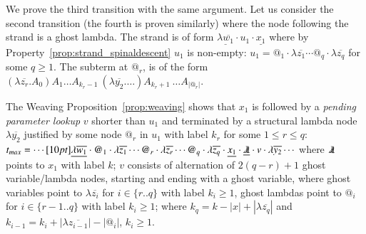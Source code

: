 \documentclass{elsarticle}
\theoremstyle{plain}
\theoremstyle{definition}
\newcommand{\ghostlmd}{{\lambda\mkern-7mu \lambda}}
\begin{document}
We prove the third transition with the same argument.
Let us consider the second transition (the fourth is proven similarly) where the node following the strand is a ghost lambda. The strand is of form $\underline{\lambda\overline{w_1}} \cdot u_1 \cdot \underline{x_1} $ where by Property~\ref{prop:strand_spinaldescent} $u_1$ is  non-empty: $u_1 =
@_1 \cdot\lambda\overline{z_1} \cdots @_q\cdot \lambda\overline{z_q}$ for some $q\geq 1$. The subterm at $@_r$, is of the form
$(\lambda\overline{z_r}. A_0) A_1 \ldots A_{k_{r}-1}\ (\lambda\overline{y_2}. \ldots)A_{k_{r}+1}\ \ldots A_{|@_r|}$.

The Weaving Proposition~\ref{prop:weaving} shows that $x_1$ is followed by a \emph{pending parameter lookup} $v$ shorter than $u_1$ and terminated by a structural lambda node $\lambda\overline{y_2}$ justified by some node $@_r$ in $u_1$ with label $k_r$ for some $1\leq r \leq q$:
$
   t_{max} = \cdots \Pstr[10pt]{
   {\underline{\lambda\overline{w_1}}}
   \cdot {@_1}
   \cdot \lambda\overline{z_1}
   \cdots %
        {@_r}
   \cdot \lambda\overline{z_r}
   \cdots {@_q}
   \cdot\lambda\overline{z_q}
   \cdot %
        {\underline{x_1}}
   \cdot %
        {\underline\ghostlmd}
   \cdot v
   \cdot %
        {\lambda\overline{y_2}}
   \cdots }
   $
where
$\ghostlmd$ points to $x_1$ with label $k$;
$v$ consists of alternation of $2(q-r) +1$ ghost variable/lambda nodes, starting and ending with a ghost variable,
where ghost variables point to $\lambda\overline{z_i}$ for
$i \in \{ r..q \}$ with label $k_i\geq1$,
ghost lambdas point to $@_i$ for $i \in \{ r-1..q \}$ with label $k_i\geq1$;
where $k_q = k - |x| + |\lambda\overline{z_q}|$ and $ k_{i-1} = k_i + |\lambda\overline{z_{i-1}}| - |@_i|$, $k_i\geq1$.
\end{document}
